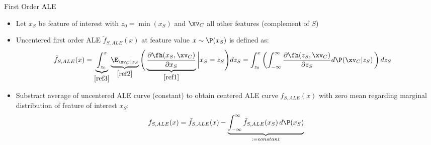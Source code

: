 \documentclass[11pt,compress,t,notes=noshow, aspectratio=169, xcolor=table]{beamer}
\begin{document}


\begin{frame}{First Order ALE}

\begin{itemize}%
\item Let $x_S$ be feature of interest with $z_0 = \min(x_S)$ and $\xv_C$ all other features  (complement of $S$)
\item Uncentered first order ALE $\tilde{f}_{S, ALE}(x)$ at feature value $x \sim \P(x_S)$ is defined as:  
$$
\begin{aligned}
\tilde{f}_{S, ALE}(x) &= \underbrace{\int_{z_{0}}^{x}}_{ \eqref{ref3}} \underbrace{\E_{\xv_C \vert x_S}}_{\eqref{ref2}} \Bigg(  \underbrace{\frac{\partial \fh(x_S, \xv_C)}{\partial x_S}}_{\eqref{ref1}} \bigg \vert x_S = z_S \Bigg) dz_S = \int_{z_{0}}^{x} \left( \int_{-\infty}^{\infty}  \frac{\partial \fh(z_S, \xv_C)}{\partial z_S} d\P(\xv_C | z_S) \,   \right) dz_S
\end{aligned}
$$
\pause
\item Substract average of uncentered ALE curve (constant) to obtain centered ALE curve $f_{S, ALE}(x)$ with zero mean regarding marginal distribution of feature of interest $x_S$:
$$
\begin{aligned}
f_{S, ALE}(x) = \tilde{f}_{S, ALE}(x) - \underbrace{\int_{-\infty}^{\infty}\tilde{f}_{S, ALE}(x_S) \, d\P(x_S)}_{:= constant}
\end{aligned}
$$
\end{itemize}



\end{frame}
\end{document}
